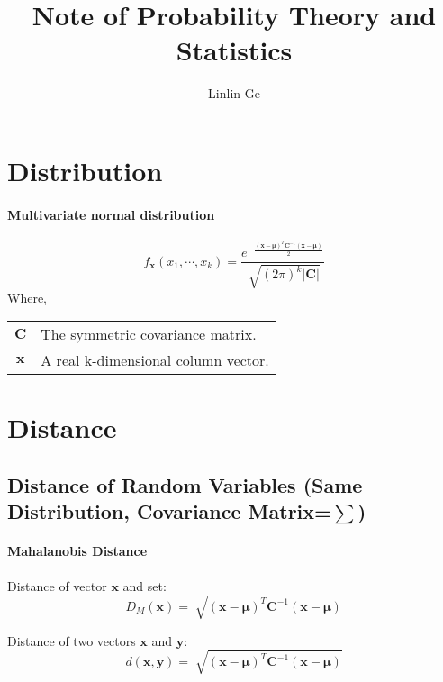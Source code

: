 \documentclass[10pt]{article}
\title{Note of Probability Theory and Statistics}
\author{Linlin Ge}
\date{}
\begin{document}
\maketitle

\section{Distribution}
\paragraph{Multivariate normal distribution} \mbox{}
$$  f_{\bm{x}}(x_1,\cdots,x_k)=\frac{ e^{-\frac{\displaystyle (\bm{x} -\bm{\mu})^T \bm{C}^{-1}(\bm{x}-\bm{\mu})}{2}}}{\sqrt[]{(2 \pi)^k \vert \bm{C} \vert}}$$
Where, 
\begin{table}[H]
\begin{tabular}{cl}
$\bm{C}$ & The symmetric covariance matrix. \\
$\bm{x}$ & A real k-dimensional column vector.\\
\end{tabular}
\end{table}



\section{Distance}
\subsection{Distance of Random Variables (Same Distribution, Covariance Matrix=$\sum$)}
\paragraph{Mahalanobis Distance} \mbox{}
\par Distance of vector $\bm{x}$ and set:
$$D_M(\bm{x})=\sqrt[]{(\bm{x}-\bm{\mu})^{T}\bm{C}^{-1}(\bm{x}-\bm{\mu})}$$

\par Distance of two vectors $\bm{x}$ and $\bm{y}$:
$$d(\bm{x},\bm{y})=\sqrt[]{(\bm{x}-\bm{\mu})^{T}\bm{C}^{-1}(\bm{x}-\bm{\mu})}$$

\begin{thebibliography}{1}



\end{thebibliography}
\end{document}
